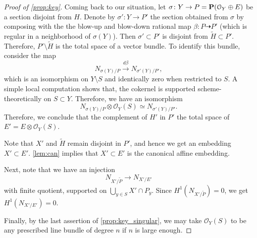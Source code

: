 \documentclass[11 pt]{amsart}
\renewcommand{\O}{{\mathcal O}}
\renewcommand {\P}{{\bf P}}
\providecommand {\from}{{\colon}}
\numberwithin{equation}{section}
\begin{document}
\begin{proof}[Proof of \autoref{prop:key}]
  Coming back to our situation, let $\sigma \from Y \to P = \P(\O_Y \oplus E)$ be a section disjoint from $H$.
  Denote by $\sigma' \from Y \to P'$ the section obtained from $\sigma$ by composing with the the blow-up and blow-down rational map $\beta \from P \dashrightarrow P'$ (which is regular in a neighborhood of $\sigma(Y)$).
  Then $\sigma' \subset P'$ is disjoint from $\widetilde H \subset P'$.
  Therefore, $P' \setminus \widetilde H$ is the total space of a vector bundle.
  To identify this bundle, consider the map
  \[N_{\sigma(Y) / P} \xrightarrow{d\beta} N_{\sigma'(Y)/P'},\]
  which is an isomorphism on $Y \setminus S$ and identically zero when restricted to $S$.
  A simple local computation shows that, the cokernel is supported scheme-theoretically on $S \subset Y$.
  Therefore, we have an isomorphism
  \[ N_{\sigma(Y) / P} \otimes \O_Y(S) \simeq N_{\sigma'(Y)/P'}.\]
  Therefore, we conclude that the complement of $H'$ in $P'$ the total space of $E' = E \otimes \O_Y(S)$.
  
  Note that $X'$ and $\widetilde H$ remain disjoint in $P'$, and hence we get an embedding $X' \subset E'$.
  \autoref{lem:can} implies that $X' \subset E'$ is the canonical affine embedding.

  Next, note that we have an injection 
  \[ N_{X'/\widetilde{P}} \to N_{X'/E'} \]
  with finite quotient, supported on $\bigcup_{y \in S} X' \cap P_y$.
  Since $H^1(N_{X'/\widetilde{P}}) = 0$, we get $H^1(N_{X'/E'}) = 0$.

  Finally, by the last assertion of \autoref{prop:key_singular}, we may take $\O_Y(S)$ to be any prescribed line bundle of degree $n$ if $n$ is large enough.
\end{proof}
\end{document}
